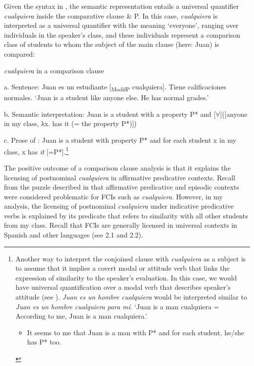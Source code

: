 \documentclass[output=paper]{langscibook}
\begin{document}
  Given the syntax in , the semantic representation entails a universal quantifier \textit{cualquiera} inside the comparative clause \& P. In this case, \textit{cualquiera} is interpreted as a universal quantifier with the meaning ‘everyone’, ranging over individuals in the speaker’s class, and these individuals represent a comparison class of students to whom the subject of the main clause (here: Juan) is compared:

\label{bkm:Ref54682554}  \textit{cualquiera} in a comparison clause

  a.  Sentence: Juan es un estudiante [\textsubscript{ModifP} cualquiera]. Tiene calificaciones normales. ‘Juan is a student like anyone else. He has normal grades.’

  b.  Semantic interpretation: Juan is a student with a property P* and [${\forall}$]([anyone in my class, λx. has it (= the property P*)])

  c.  Prose of : Juan is a student with property P* and for each student x in my class, x has \textit{it} [=P*].\footnote{ \textrm{Another way to interpret the conjoined clause with} \textrm{\textit{cualquiera}} \textrm{as a subject is to assume that it implies a covert modal or attitude verb that links the expression of similarity to the speaker’s evaluation. In this case, we would have universal quantification over a modal verb that describes speaker’s attitude (see ).} \textrm{\textit{Juan es un hombre cualquiera}} \textrm{would be interpreted similar to} \textrm{\textit{Juan es un hombre cualquiera para mí}}\textrm{. ‘Juan is a man cualquiera = According to me, Juan is a man cualquiera.’}

\begin{itemize}
\item \begin{styleFootnote}
\textrm{It seems to me that Juan is a man with P* and for each student, he/she has P* too.}
\end{styleFootnote}
\end{itemize}
}

The positive outcome of a comparison clause analysis is that it explains the licensing of postnominal \textit{cualquiera} in affirmative predicative contexts. Recall from the puzzle described in  that affirmative predicative and episodic contexts were considered problematic for FCIs such as \textit{cualquiera}. However, in my analysis, the licensing of postnominal \textit{cualquiera} under indicative predicative verbs is explained by its predicate that refers to similarity with all other students from my class. Recall that FCIs are generally licensed in universal contexts in Spanish and other languages (see 2.1 and 2.2).
\end{document}
